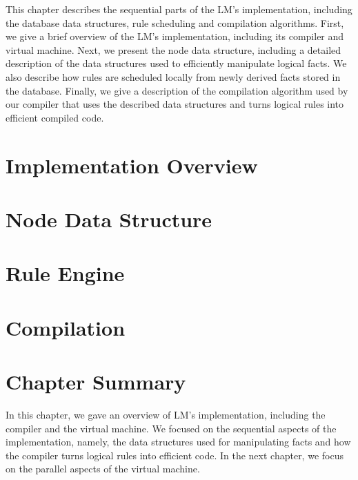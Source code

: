 
This chapter describes the sequential parts of the LM's implementation,
including the database data structures, rule scheduling and compilation
algorithms. First, we give a brief overview of the LM's implementation,
including its compiler and virtual machine. Next, we present the node data
structure, including a detailed description of the data structures used to
efficiently manipulate logical facts. We also describe how rules are scheduled
locally from newly derived facts stored in the database.  Finally, we give a
description of the compilation algorithm used by our compiler that uses the
described data structures and turns logical rules into efficient compiled code.

\section{Implementation Overview}


\section{Node Data Structure}\label{sec:data_structures}


\section{Rule Engine}\label{section:local:rule_engine}\label{sec:implementation:rule_engine}


\section{Compilation}


\section{Chapter Summary}

In this chapter, we gave an overview of LM's implementation, including the
compiler and the virtual machine. We focused on the sequential aspects of the
implementation, namely, the data structures used for manipulating facts and how
the compiler turns logical rules into efficient code. In the next chapter, we
focus on the parallel aspects of the virtual machine.
